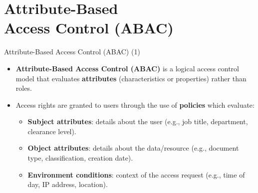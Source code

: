 \section[Attribute-Based Access Control]{Attribute-Based \\ Access Control (ABAC)}

\begin{frame}{Attribute-Based Access Control (ABAC) (1)}
    \Large
    \begin{itemize}
        \item \textbf{Attribute-Based Access Control (ABAC)} is a logical access control model that evaluates \textbf{attributes} (characteristics or properties) rather than roles.
        
        \vspace{0.3cm}
        \item Access rights are granted to users through the use of \textbf{policies} which evaluate:
        \begin{itemize}
            \normalsize
            \setlength{\itemsep}{0.2cm}
            \item \textbf{Subject attributes}: details about the user (e.g., job title, department, clearance level).
            \item \textbf{Object attributes}: details about the data/resource (e.g., document type, classification, creation date).
            \item \textbf{Environment conditions}: context of the access request (e.g., time of day, IP address, location).
        \end{itemize}
    \end{itemize}
\end{frame}

